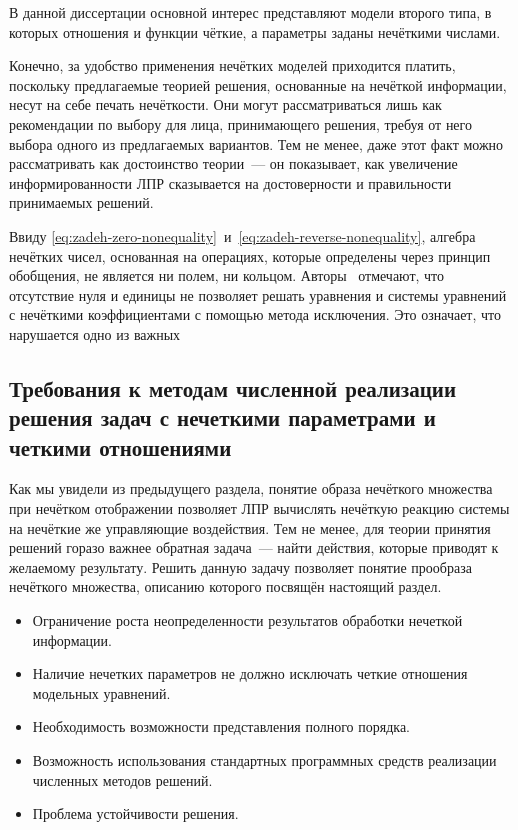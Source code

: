 В данной диссертации основной интерес представляют модели второго типа, в которых отношения и функции чёткие, а параметры заданы нечёткими числами. 

Конечно, за удобство применения нечётких моделей приходится платить, поскольку предлагаемые теорией решения, основанные на нечёткой информации, несут на себе печать нечёткости. Они могут рассматриваться лишь как рекомендации по выбору для лица, принимающего решения, требуя от него выбора одного из предлагаемых вариантов. Тем не менее, даже этот факт можно рассматривать как достоинство теории~--- он показывает, как увеличение информированности ЛПР сказывается на достоверности и правильности принимаемых решений.

Ввиду \eqref{eq:zadeh-zero-nonequality}~и~\eqref{eq:zadeh-reverse-nonequality}, алгебра нечётких чисел, основанная на операциях, которые определены через принцип обобщения, не является ни полем, ни кольцом. Авторы~\cite{Rutkovskaya} отмечают, что отсутствие нуля и единицы не позволяет решать уравнения и системы уравнений с нечёткими коэффициентами с помощью метода исключения. Это означает, что нарушается одно из важных


\subsection{Требования к методам численной реализации решения задач с нечеткими параметрами и четкими отношениями}

Как мы увидели из предыдущего раздела, понятие образа нечёткого множества при нечётком отображении позволяет ЛПР вычислять нечёткую реакцию системы на нечёткие же управляющие воздействия. Тем не менее, для теории принятия решений горазо важнее обратная задача~--- найти действия, которые приводят к желаемому результату. Решить данную задачу позволяет понятие прообраза нечёткого множества, описанию которого посвящён настоящий раздел.

\begin{itemize}
	\item Ограничение роста неопределенности результатов обработки нечеткой информации.
	\item Наличие нечетких параметров не должно исключать четкие отношения модельных уравнений.
	\item Необходимость возможности представления полного порядка.
	\item Возможность использования стандартных программных средств реализации численных методов решений.
	\item Проблема устойчивости решения.
\end{itemize}
